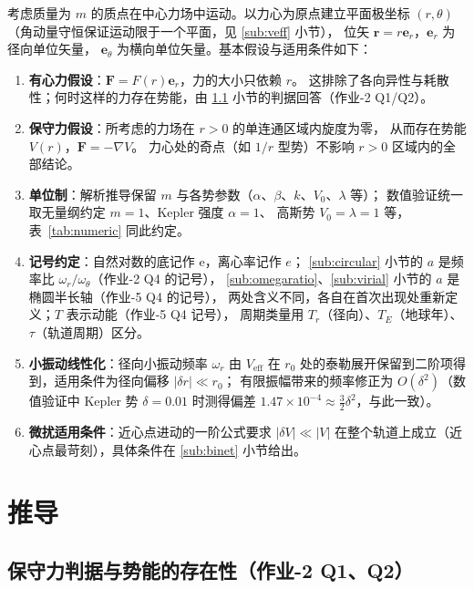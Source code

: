 \documentclass[UTF8,a4paper,11pt]{ctexart}
\begin{document}
考虑质量为 $m$ 的质点在中心力场中运动。以力心为原点建立平面极坐标 $(r,\theta)$
（角动量守恒保证运动限于一个平面，见 \ref{sub:veff} 小节），
位矢 $\boldsymbol{r}=r\boldsymbol{e}_r$，$\boldsymbol{e}_r$ 为径向单位矢量，
$\boldsymbol{e}_\theta$ 为横向单位矢量。基本假设与适用条件如下：

\begin{enumerate}
  \item \textbf{有心力假设}：$\boldsymbol{F}=F(r)\boldsymbol{e}_r$，力的大小只依赖 $r$。
        这排除了各向异性与耗散性；何时这样的力存在势能，由
        \ref{sub:conservative} 小节的判据回答（作业-2 Q1/Q2）。
  \item \textbf{保守力假设}：所考虑的力场在 $r>0$ 的单连通区域内旋度为零，
        从而存在势能 $V(r)$，$\boldsymbol{F}=-\nabla V$。
        力心处的奇点（如 $1/r$ 型势）不影响 $r>0$ 区域内的全部结论。
  \item \textbf{单位制}：解析推导保留 $m$ 与各势参数（$\alpha$、$\beta$、$k$、$V_0$、$\lambda$ 等）；
        数值验证统一取无量纲约定 $m=1$、Kepler 强度 $\alpha=1$、
        高斯势 $V_0=\lambda=1$ 等，表~\ref{tab:numeric} 同此约定。
  \item \textbf{记号约定}：自然对数的底记作 $\mathrm{e}$，离心率记作 $e$；
        \ref{sub:circular} 小节的 $a$ 是频率比 $\omega_r/\omega_\theta$（作业-2 Q4 的记号），
        \ref{sub:omegaratio}、\ref{sub:virial} 小节的 $a$ 是椭圆半长轴（作业-5 Q4 的记号），
        两处含义不同，各自在首次出现处重新定义；$T$ 表示动能（作业-5 Q4 记号），
        周期类量用 $T_r$（径向）、$T_E$（地球年）、$\tau$（轨道周期）区分。
  \item \textbf{小振动线性化}：径向小振动频率 $\omega_r$ 由 $V_{\mathrm{eff}}$ 在 $r_0$
        处的泰勒展开保留到二阶项得到，适用条件为径向偏移 $|\delta r|\ll r_0$；
        有限振幅带来的频率修正为 $O(\delta^2)$（数值验证中 Kepler 势
        $\delta=0.01$ 时测得偏差 $1.47\times10^{-4}\approx\frac32\delta^2$，与此一致）。
  \item \textbf{微扰适用条件}：近心点进动的一阶公式要求 $|\delta V|\ll|V|$
        在整个轨道上成立（近心点最苛刻），具体条件在 \ref{sub:binet} 小节给出。
\end{enumerate}

\section{推导}
\label{sec:derive}

\subsection{保守力判据与势能的存在性（作业-2 Q1、Q2）}
\label{sub:conservative}
\end{document}
